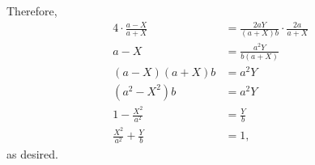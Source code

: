 \begin{enumerate}
          Therefore,
          \begin{align*}
              4 \cdot \frac{a-X}{a+X}       & = \frac{2aY}{(a+X)b} \cdot \frac{2a}{a+X} \\
              a-X                           & = \frac{a^2 Y}{b(a+X)}                    \\
              (a-X)(a+X)b                   & = a^2Y                                    \\
              (a^2 - X^2) b                 & = a^2 Y                                   \\
              1 - \frac{X^2}{a^2}           & = \frac{Y}{b}                             \\
              \frac{X^2}{a^2} + \frac{Y}{b} & = 1,
          \end{align*}
          as desired.
\end{enumerate}